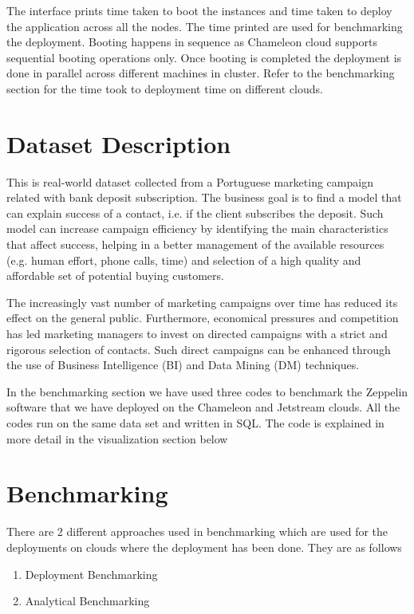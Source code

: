 \documentclass[9pt,twocolumn,twoside]{../../styles/osajnl}
\begin{document}
	The interface prints time taken to boot the instances and time 
	taken
	to deploy the application across all the nodes. The time printed 
	are
	used for benchmarking the deployment. Booting happens in sequence 
	as
	Chameleon cloud supports sequential booting operations only. Once
	booting is completed the deployment is done in parallel across
	different machines in cluster. Refer to the benchmarking section 
	for
	the time took to deployment time on different clouds.
	
	\section{Dataset Description}
	
	This is real-world dataset\cite{www-datasetdes} collected from a 
	Portuguese marketing campaign related with bank deposit 
	subscription. 
	The business goal is to find a model that can explain success of 
	a 
	contact, i.e. if the client subscribes the deposit. Such model 
	can 
	increase campaign efficiency by identifying the main 
	characteristics 
	that affect success, helping in a better management of the 
	available 
	resources (e.g. human effort, phone calls, time) and selection of 
	a 
	high quality and affordable set of potential buying customers.
	
	The increasingly vast number of marketing campaigns over time has 
	reduced its effect on the general public. Furthermore, economical 
	pressures and competition has led marketing managers to invest on 
	directed campaigns with a strict and rigorous selection of 
	contacts. 
	Such direct campaigns can be enhanced through the use of Business 
	Intelligence (BI) and Data Mining (DM) techniques.
	
	In the benchmarking section we have used three codes to benchmark 
	the Zeppelin software that we have deployed on the Chameleon and 
	Jetstream clouds. All the codes run on the same data set and 
	written in SQL. The code is explained in more detail in the 
	visualization section below
	
	\section{Benchmarking}
	
	There are 2 different approaches used in benchmarking which are 
	used 
	for the deployments on clouds where the deployment has been done. 
	They are as follows
	
	\begin{enumerate}
		\item Deployment Benchmarking
		\item Analytical Benchmarking
	\end{enumerate}
	
\end{document}
